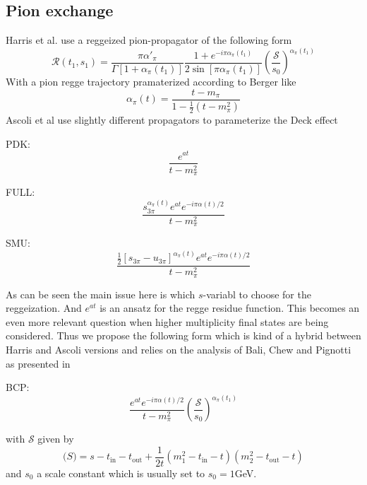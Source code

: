\documentclass[12pt]{article}
\begin{document}
\subsection{Pion exchange}

Harris et al. use a reggeized pion-propagator of the following form
\begin{equation}
\mathcal{R}(t_1,s_1)=\frac{\pi\alpha'_\pi}{\Gamma[1+\alpha_\pi(t_1)]}\frac{1+e^{-i\pi\alpha_\pi(t_1)}}{2\sin[\pi\alpha_\pi(t_1)]}\left(\frac{\mathcal{S}}{s_0}\right)^{\alpha_\pi(t_1)}
\end{equation}
With a pion regge trajectory pramaterized according to Berger like
\begin{equation}
\alpha_\pi(t)=\frac{t-m_\pi}{1-\frac{1}{2}(t-m_\pi^2)}
\end{equation}
Ascoli et al use slightly different propagators to parameterize the Deck effect

PDK:
\begin{equation}
\frac{e^{at}}{t-m_\pi^2}
\end{equation}

FULL:
\begin{equation}
\frac{s_{3\pi}^{\alpha_\pi(t)}e^{at}e^{-i\pi\alpha(t)/2}}{t-m_\pi^2}
\end{equation}

SMU:
\begin{equation}
\frac{\frac{1}{2}[s_{3\pi}-u_{3\pi}]^{\alpha_\pi(t)}e^{at}e^{-i\pi\alpha(t)/2}}{t-m_\pi^2}
\end{equation}

As can be seen the main issue here is which $s$-variabl to choose for the reggeization. And $e^{at}$ is an ansatz for the regge residue function. This becomes an even more relevant question when higher multiplicity final states are being considered. Thus we propose the following form which is kind of a hybrid between Harris and Ascoli versions and relies on the analysis of Bali, Chew and Pignotti \cite{BCP} as presented in \cite{Harris}

BCP:
\begin{equation}
\frac{e^{at}e^{-i\pi\alpha(t)/2}}{t-m_\pi^2}\left(\frac{\mathcal{S}}{s_0}\right)^{\alpha_\pi(t_1)}
\end{equation}

with $\mathcal{S}$ given by
\begin{equation}
\mathcal(S)= s - t_\mathrm{in} -t_\mathrm{out} + \frac{1}{2t}\left(m_1^2-t_\mathrm{in}-t\right)\left(m_2^2-t_\mathrm{out}-t\right)
\end{equation}
and $s_0$ a scale constant which is usually set to $s_0=1$GeV.
\end{document}

